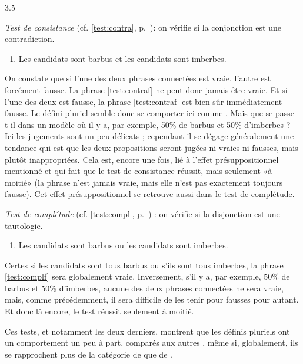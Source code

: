 \begin{Solution}{3.{5}}
\smallskip

\noindent\emph{Test de consistance} (cf. \ref{test:contra}, p.~\pageref{test:contra}): on vérifie si la conjonction  est une contradiction.

\begin{enumerate}[label=(\arabic*),resume]
\item Les candidats sont barbus et les candidats sont imberbes.\label{test:contraf}
\end{enumerate}


On constate que si l'une des deux phrases connectées est vraie, l'autre est forcément fausse.  La phrase \ref{test:contraf} ne peut donc jamais être vraie.
Et si l'une des deux est fausse, la phrase \ref{test:contraf} est bien sûr immédiatement fausse.  Le défini pluriel semble donc se comporter ici comme .   Mais que se passe-t-il dans
 un modèle où il y a, par exemple, 50\% de barbus et 50\% d'imberbes ?
Ici les jugements sont un peu délicats ; cependant il se dégage généralement  une tendance  qui est que les deux propositions seront jugées ni vraies ni fausses, mais plutôt inappropriées. Cela est, encore une fois,  lié à l'effet présuppositionnel mentionné  et qui fait que le test de consistance réussit, mais seulement «à moitié» (la phrase n'est jamais vraie, mais elle n'est pas exactement toujours fausse).   Cet effet présuppositionnel se retrouve aussi dans le test de complétude.

\smallskip

\noindent\emph{Test de complétude} (cf. \ref{test:compl}, p.~\pageref{test:compl}) : on vérifie si la disjonction  est une tautologie.

\begin{enumerate}[label=(\arabic*),resume]
\item Les candidats sont barbus ou les candidats sont imberbes.\label{test:complf}
\end{enumerate}

Certes si les candidats sont tous barbus ou s'ils sont tous imberbes, la phrase \ref{test:complf} sera globalement vraie.  Inversement, s'il y a, par exemple, 50\% de barbus et 50\% d'imberbes, aucune des deux phrases connectées ne sera vraie, mais, comme précédemment, il sera difficile de les tenir pour fausses pour autant.  Et donc là encore, le test réussit seulement à moitié.

Ces tests, et notamment les deux derniers, montrent que les définis pluriels ont un comportement un peu à part, comparés aux autres \GN, même si, globalement, ils se rapprochent plus de la catégorie de  que de .
\end{Solution}
